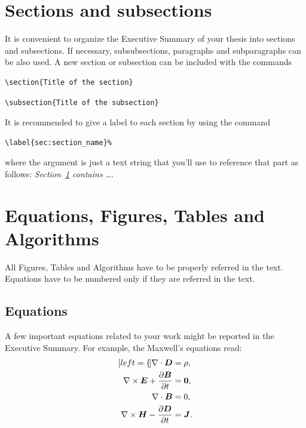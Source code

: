 \documentclass[11pt,a4paper,twocolumn]{article}
\begin{document}
\section{Sections and subsections}
\label{sec:sec_and_subsec}
It is convenient to organize the Executive Summary of your thesis into sections and subsections. 
If necessary, subsubsections, paragraphs and subparagraphs can be also used. 
A new section or subsection can be included  with the commands
\begin{verbatim}
\section{Title of the section}
\end{verbatim}
\begin{verbatim}
\subsection{Title of the subsection}
\end{verbatim}
It is recommended to give a label to each section by using the command
\begin{verbatim}
\label{sec:section_name}%
\end{verbatim}
where the argument is just a text string that you'll use to reference that part
as follows: \textit{Section~\ref{sec:sec_and_subsec} contains   \dots}.\\

\section{Equations, Figures, Tables and Algorithms}
\label{sec:equations_and_figures}
All Figures, Tables and Algorithms have to be properly referred in the text.
Equations have to be numbered only if they are referred in the text.
\subsection{Equations}
\label{sec_equations}
A few important equations related to your work might be reported in the Executive Summary. For example, the Maxwell's equations read:
\begin{subequations}
    \label{eq:maxwell}
    \begin{align}[left=\empheqlbrace]
    \nabla\cdot \bm{D} & = \rho, \label{eq:maxwell1} \\
    \nabla \times \bm{E} +  \frac{\partial \bm{B}}{\partial t} & = \bm{0}, \label{eq:maxwell2} \\
    \nabla\cdot \bm{B} & = 0, \label{eq:maxwell3} \\
    \nabla \times \bm{H} - \frac{\partial \bm{D}}{\partial t} &= \bm{J}. \label{eq:maxwell4}
    \end{align}
\end{subequations}
\end{document}
